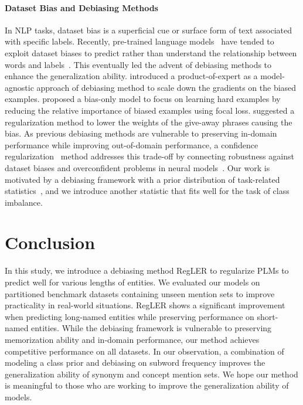 \documentclass[11pt]{article}
\begin{document}
\paragraph{Dataset Bias and Debiasing Methods}
In NLP tasks, dataset bias is a superficial cue or surface form of text associated with specific labels.
Recently, pre-trained language models~\cite{devlin2019bert,liu2019roberta,lee2020biobert} have tended to exploit dataset biases to predict rather than understand the relationship between words and labels~\cite{gururangan2018annotation,mccoy2019right,geirhos2020shortcut,bender-koller-2020-climbing,utama2020towards,du2021interpreting}. 
This eventually led the advent of debiasing methods to enhance the generalization ability.
\citet{clark2019don} introduced a product-of-expert as a model-agnostic approach of debiasing method to scale down the gradients on the biased examples.
\citet{mahabadi2020end} proposed a bias-only model to focus on learning hard examples by reducing the relative importance of biased examples using focal loss.
\citet{schuster-etal-2019-towards} suggested a regularization method to lower the weights of the give-away phrases causing the bias.
As previous debiasing methods are vulnerable to preserving in-domain performance while improving out-of-domain performance, a confidence regularization~\cite{utama2020mind} method addresses this trade-off by connecting robustness against dataset biases and overconfident problems in neural models~\cite{papernot2016distillation,feng2018pathologies}.
Our work is motivated by a debiasing framework with a prior distribution of task-related statistics~\cite{ko2020look,kim2021your}, and we introduce another statistic that fits well for the task of class imbalance.


\section{Conclusion}
In this study, we introduce a debiasing method RegLER to regularize PLMs to predict well for various lengths of entities.
We evaluated our models on partitioned benchmark datasets containing unseen mention sets to improve practicality in real-world situations.
RegLER shows a significant improvement when predicting long-named entities while preserving performance on short-named entities.
While the debiasing framework is vulnerable to preserving memorization ability and in-domain performance, our method achieves competitive performance on all datasets.
In our observation, a combination of modeling a class prior and debiasing on subword frequency improves the generalization ability of synonym and concept mention sets.
We hope our method is meaningful to those who are working to improve the generalization ability of models.
\end{document}
